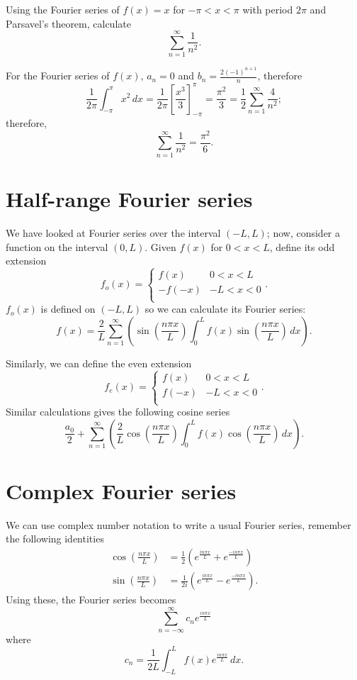 \begin{example}
    Using the Fourier series of $f(x) = x$ for $-\pi < x < \pi$ with period $2\pi$ and Parsavel's theorem, calculate \[ \sum_{n = 1}^\infty \frac{1}{n^2}. \]
    
    For the Fourier series of $f(x)$, $a_n = 0$ and $b_n = \frac{2 (-1)^{n+1}}{n}$, therefore \[ \frac{1}{2 \pi} \int^{\pi}_{-\pi} x^2 \, dx = \frac{1}{2 \pi} \left[ \frac{x^3}{3} \right]^{\pi}_{-\pi} = \frac{\pi^2}{3} = \frac{1}{2} \sum_{n = 1}^{\infty} \frac{4}{n^2}; \] therefore, \[ \sum_{n = 1}^\infty \frac{1}{n^2} = \frac{\pi^2}{6}. \]
\end{example}

\section{Half-range Fourier series}

We have looked at Fourier series over the interval $(-L, L)$; now, consider a function on the interval $(0, L)$. Given $f(x)$ for $0 < x < L$, define its odd extension
\[
    f_{o}(x) = 
    \begin{cases}
        f(x) & 0 < x < L \\
        -f(-x) & -L < x < 0 \\
    \end{cases}
    .
\]
$f_o(x)$ is defined on $(-L, L)$ so we can calculate its Fourier series: \[ f(x) = \frac{2}{L} \sum_{n = 1}^{\infty} \left( \sin{\left(\frac{n \pi x}{L}\right)} \int_{0}^{L} f(x) \sin{\left(\frac{n \pi x}{L}\right)} \, dx \right). \]

Similarly, we can define the even extension 
\[
    f_{e}(x) = 
    \begin{cases}
        f(x) & 0 < x < L \\
        f(-x) & -L < x < 0 \\
    \end{cases}
    .
\] 
Similar calculations gives the following cosine series \[ \frac{a_0}{2} + \sum_{n = 1}^{\infty} \left( \frac{2}{L} \cos{\left(\frac{n \pi x}{L}\right)} \int_{0}^{L} f(x) \cos{\left(\frac{n \pi x}{L}\right)} \, dx \right). \]

\section{Complex Fourier series}

We can use complex number notation to write a usual Fourier series, remember the following identities
\begin{align*}
    \cos{\left(\frac{n \pi x}{L}\right)} &= \frac{1}{2} \left( e^{\frac{i n \pi x}{L}}+e^{\frac{-i n \pi x}{L}} \right) \\
    \sin{\left(\frac{n \pi x}{L}\right)} &= \frac{1}{2i} \left( e^{\frac{i n \pi x}{L}}-e^{\frac{-i n \pi x}{L}} \right).
\end{align*}
Using these, the Fourier series becomes \[ \sum_{n = -\infty}^{\infty} c_n e^{\frac{i n \pi x}{L}} \] where \[ c_n = \frac{1}{2L} \int_{-L}^{L} f(x) e^{\frac{i n \pi x}{L}} \, dx. \]
